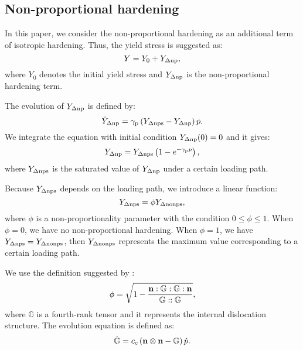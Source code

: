 \subsection{Non-proportional hardening}
\noindent
In this paper, we consider the non-proportional hardening as an additional term of isotropic hardening.
Thus, the yield stress is suggested as:
\begin{equation}
Y = {Y_0} + {Y_{\Delta \rm np}},
\end{equation}
where $Y_0$ denotes the initial yield stress and ${Y_{\Delta \rm np}}$ is the non-proportional hardening term.

The evolution of ${Y_{\Delta \rm np}}$ is defined by:
\begin{equation}
{\dot Y_{\Delta \rm np}} = {\gamma _{\rm p}}\left( {{Y_{\Delta \rm nps}} - {Y_{\Delta \rm np}}} \right)\dot p.
\end{equation}
We integrate the equation with initial condition ${Y_{\Delta \rm np}}(0)=0$ and it gives:
\begin{equation}
{Y_{\Delta \rm np}} = Y_{\Delta \rm nps}\left( 1-e^{- \gamma_{\rm p} p} \right),
\end{equation}
where $Y_{\Delta \rm nps}$ is the saturated value of ${Y_{\Delta \rm np}}$ under a certain loading path.

Because ${Y_{\Delta \rm nps}}$ depends on the loading path, we introduce a linear function:
\begin{equation}
{Y_{\Delta \rm nps}} = \phi {Y_{\Delta \rm nonps}},
\end{equation}
where $\phi$ is a non-proportionality parameter with the condition $0 \leq \phi \leq 1$.
When $\phi = 0$, we have no non-proportional hardening.
When $\phi = 1$, we have ${Y_{\Delta \rm nps}} = {Y_{\Delta \rm nonps}}$, then ${Y_{\Delta \rm nonps}}$ represents the maximum value corresponding to a certain loading path.

We use the definition suggested by \cite{tanaka1994nonproportionality}:
\begin{equation}
\phi  = \sqrt {1 - \frac{{{\bf{n}}:\mathbb{G}:\mathbb{G}:{\bf{n}}}}{{\mathbb{G}::\mathbb{G}}}},
\end{equation}
where $\mathbb{G}$ is a fourth-rank tensor and it represents the internal dislocation structure.
The evolution equation is defined as:
\begin{equation}
\dot {\mathbb{G}} = {c_c}\left( {{\bf{n}} \otimes {\bf{n}} - \mathbb{G}} \right)\dot p.
\end{equation}


